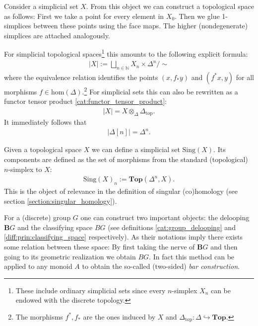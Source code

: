     \begin{example}\label{model:geometric_realization}
        Consider a simplicial set $X$. From this object we can construct a topological space as follows: First we take a point for every element in $X_0$. Then we glue 1-simplices between these points using the face maps. The higher (nondegenerate) simplices are attached analogously.

        For simplicial topological spaces\footnote{These include ordinary simplicial sets since every $n$-simplex $X_n$ can be endowed with the discrete topology.} this amounts to the following explicit formula:
        \begin{gather}
            |X| := \bigsqcup_{n\in\mathbb{N}}X_n\times\Delta^n / \sim
        \end{gather}
        where the equivalence relation identifies the points $(x,f_*y)$ and $(f^*x,y)$ for all morphisms $f\in\text{hom}(\Delta)$.\footnote{The morphisms $f^*, f_*$ are the ones induced by $X$ and $\Delta_{\text{top}}:\Delta\hookrightarrow\mathbf{Top}$.} For simplicial sets this can also be rewritten as a functor tensor product \ref{cat:functor_tensor_product}:
        \begin{gather}
            |X| = X\otimes_{\Delta}\Delta_{\text{top}}.
        \end{gather}
        It immediately follows that
        \begin{gather}
            |\Delta[n]| = \Delta^n.
        \end{gather}
    \end{example}
    \begin{example}\label{model:singular_set}
        Given a topological space $X$ we can define a simplicial set $\text{Sing}(X)$. Its components are defined as the set of morphisms from the standard (topological) $n$-simplex to $X$:
        \begin{gather}
            \text{Sing}(X)_n := \mathbf{Top}(\Delta^n, X).
        \end{gather}
        This is the object of relevance in the definition of singular (co)homology (see section \ref{section:singular_homology}).
    \end{example}

    \begin{property}
        For a (discrete) group $G$ one can construct two important objects: the delooping $\mathbf{B}G$ and the classifying space $BG$ (see definitions \ref{cat:group_delooping} and \ref{diff:prin:classifying_space} respectively). As their notations imply there exists some relation between these space: By first taking the nerve of $\mathbf{B}G$ and then going to its geometric realization we obtain $BG$. In fact this method can be applied to any monoid $A$ to obtain the so-called (two-sided) \textit{bar construction}.
    \end{property}

